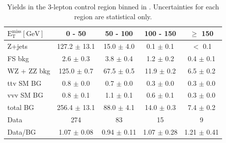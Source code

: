 \begin{table}[htb]
  \scriptsize
  \begin{center}
    \caption{\label{tab:met_CR3lep} 
      Yields in the 3-lepton control region binned in \MET. Uncertainties for each region are statistical only. 
    }
    \begin{tabular}{l|c|c|c|c}
      \hline
      \hline
      $\mathrm{E_{T}^{miss} [GeV]}$ &0 - 50 & 50 - 100 & 100 - 150 & $\geq$ 150 \\
      \hline 
      Z+jets&  127.2 $\pm$ 13.1 &  15.0 $\pm$ 4.0 &  0.1 $\pm$ 0.1 &  $<$ 0.1 \\ 
      FS bkg&  2.6 $\pm$ 0.3 &  3.8 $\pm$ 0.4 &  1.2 $\pm$ 0.2 &  0.4 $\pm$ 0.1 \\ 
      WZ + ZZ bkg&  125.0 $\pm$ 0.7 &  67.5 $\pm$ 0.5 &  11.9 $\pm$ 0.2 &  6.5 $\pm$ 0.2 \\ 
      ttv SM BG&  0.8 $\pm$ 0.0 &  0.7 $\pm$ 0.0 &  0.3 $\pm$ 0.0 &  0.3 $\pm$ 0.0 \\ 
      vvv SM BG&  0.8 $\pm$ 0.1 &  1.1 $\pm$ 0.1 &  0.6 $\pm$ 0.1 &  0.3 $\pm$ 0.0 \\ 
      \hline 
      total BG&  256.4 $\pm$ 13.1 &  88.0 $\pm$ 4.1 &  14.0 $\pm$ 0.3 &  7.4 $\pm$ 0.2 \\ 
      \hline 
      Data&  274 &  83 &  15 &  9 \\ 
      \hline 
      Data/BG&  1.07 $\pm$ 0.08 &  0.94 $\pm$ 0.11 &  1.07 $\pm$ 0.28 &  1.21 $\pm$ 0.41 \\ 
      \hline
      \hline
    \end{tabular}
  \end{center}
\end{table}


